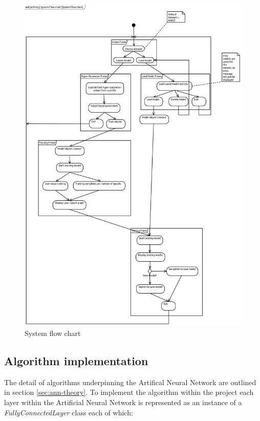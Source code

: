 \documentclass[./project-report/src/latex/project-report.tex]{subfiles}
\begin{document}
\begin{figure}[h!]
\centering
\includegraphics[width=1\textwidth]{./project-report/src/images/system-flow-chart.png}
\caption{System flow chart}
\label{fig:system-flow-chart}
\end{figure}

\subsection{Algorithm implementation}

The detail of algorithms underpinning the Artifical Neural Network are outlined in section \ref{sec:ann-theory}. To implement the algorithm within the project each layer 
within the Artificial Neural Network is represented as an instance of a \textit{FullyConnectedLayer} class each of which:
\end{document}
